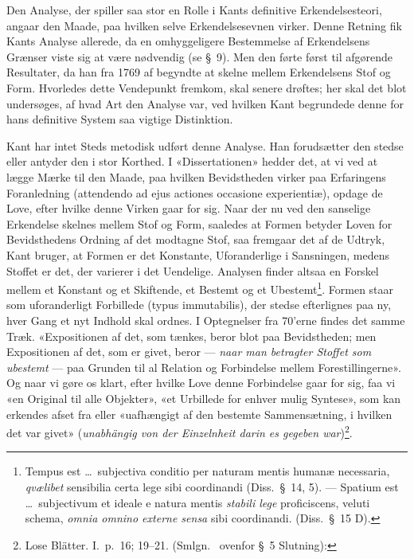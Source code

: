\documentclass[12pt,a4paper]{article}
\newcommand{\apage}[1]{\marginnote{\footnotesize\textit{[#1]}}}
\begin{document}
Den Analyse, der spiller saa stor en Rolle i Kants definitive
Erkendelsesteori, angaar den Maade, paa hvilken selve Erkendelsesevnen
virker. Denne Retning fik Kants Analyse allerede, da en omhyggeligere
Bestemmelse af Erkendelsens Grænser viste sig at være nødvendig (se §\
9). Men den førte først til afgørende Resultater, da han fra 1769 af
begyndte at skelne mellem Erkendelsens Stof og Form. Hvorledes dette
Vendepunkt fremkom, skal senere drøftes; her skal det blot undersøges, af
hvad Art den Analyse var, ved hvilken Kant begrundede denne for hans
definitive System saa vigtige Distinktion.

Kant har intet Steds metodisk udført denne Analyse. Han forudsætter den
stedse eller antyder den i stor Korthed. I «Dissertationen» hedder det,
at vi ved at lægge Mærke til den Maade, paa hvilken Bevidstheden virker
paa Erfaringens Foranledning (attendendo ad ejus actiones
occasione experientiæ), opdage de Love, efter hvilke denne Virken gaar
for sig. Naar der nu ved den sanselige Erkendelse skelnes mellem Stof og
Form, saaledes at Formen betyder Loven for Bevidsthedens Ordning af det
modtagne Stof, saa fremgaar det af de Udtryk, Kant bruger, at Formen er
det Konstante, Uforanderlige i Sansningen, medens Stoffet er det, der
varierer i det Uendelige. Analysen finder altsaa en Forskel mellem et
Konstant og et Skiftende, et Bestemt og et
Ubestemt\footnote{Tempus est \ldots\ subjectiva conditio per
naturam mentis humanæ necessaria, \emph{qvælibet} sensibilia certa lege
sibi coordinandi (Diss.\ §\ 14, 5). --- Spatium est \ldots\
subjectivum et ideale e natura mentis \emph{stabili lege} proficiscens, veluti
schema, \emph{omnia omnino externe sensa} sibi coordinandi. (Diss.\ §\ 15
D).}. Formen staar som uforanderligt Forbillede (typus
immutabilis), der stedse efterlignes paa ny, hver Gang et nyt Indhold
skal ordnes. I Optegnelser fra 70'erne findes det samme Træk.
«Expositionen af det, som tænkes, beror blot paa Bevidstheden; men
Expositionen af det, som er givet, beror --- \emph{naar man betragter Stoffet
som ubestemt} --- paa Grunden til al Relation og Forbindelse mellem
Forestillingerne». Og naar vi gøre os klart, efter hvilke Love denne
Forbindelse gaar for sig, faa vi «en Original til alle Objekter», «et
\apage{27} Urbillede for enhver mulig Syntese», som kan erkendes afset fra eller
«uafhængigt af den bestemte Sammensætning, i hvilken det var givet»
(\emph{unabhängig von der Einzelnheit darin es gegeben
war})\footnote{Lose Blätter. I.\ p.\ 16; 19--21. (Smlgn.\
ovenfor §\ 5 Slutning):}.
\end{document}
